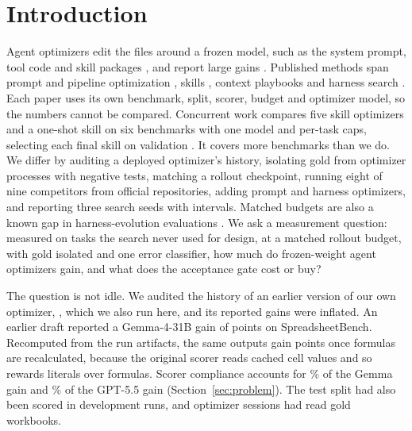 \section{Introduction}
\label{sec:intro}

Agent optimizers edit the files around a frozen model, such as the system prompt, tool code and skill packages \citep{agent_skills_docs}, and report large gains \citep{skillopt,meta-harness}. Published methods span prompt and pipeline optimization \citep{dspy,miprov2-dspy,gepa}, skills \citep{skillopt,evoskill,trace2skill,wikiskill}, context playbooks \citep{ace} and harness search \citep{meta-harness,xu2026harnesslens}. Each paper uses its own benchmark, split, scorer, budget and optimizer model, so the numbers cannot be compared. Concurrent work compares five skill optimizers and a one-shot skill on six benchmarks with one model and per-task caps, selecting each final skill on validation \citep{piao2026skillsgeneralize}. It covers more benchmarks than we do. We differ by auditing a deployed optimizer's history, isolating gold from optimizer processes with negative tests, matching a rollout checkpoint, running eight of nine competitors from official repositories, adding prompt and harness optimizers, and reporting three search seeds with intervals. Matched budgets are also a known gap in harness-evolution evaluations \citep{rethinkharness}. We ask a measurement question: measured on tasks the search never used for design, at a matched rollout budget, with gold isolated and one error classifier, how much do frozen-weight agent optimizers gain, and what does the acceptance gate cost or buy?

The question is not idle. We audited the history of an earlier version of our own optimizer, \capevolve{}, which we also run here, and its reported gains were inflated. An earlier draft reported a Gemma-4-31B gain of \histGemmaDeltaSaved{} points on SpreadsheetBench. Recomputed from the run artifacts, the same outputs gain \histGemmaDeltaRecalc{} points once formulas are recalculated, because the original scorer reads cached cell values and so rewards literals over formulas. Scorer compliance accounts for \histGemmaComplianceShare{}\% of the Gemma gain and \histGptComplianceShare{}\% of the GPT-5.5 gain (Section~\ref{sec:problem}). The test split had also been scored in development runs, and optimizer sessions had read gold workbooks.

